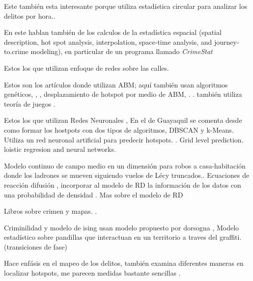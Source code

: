 \documentclass[onecolumn,12pt,letterpaper]{article}
\begin{document}
Este también esta interesante porque utiliza estadística circular para analizar los delitos por hora.\cite{brunsdon2006using}.


En este hablan también de los calculos de la estadística espacial (spatial description, hot spot analysis, interpolation, space-time analysis, and journey-to.crime modeling), en particular de un programa llamado \textit{CrimeStat}\cite{levine2006crime}

Estos los que utilizan enfoque de redes sobre las calles\cite{rosser_predictive_2017}. \cite{porta_network_2006} \cite{porta_network_2006-1} \cite{davies_modelling_2013}

Estos son los artículos donde utilizan ABM; aquí también usan algoritmos genéticos\cite{furtado_bio-inspired_2009}, \cite{malleson_agent-based_2009}, \cite{malleson_crime_2010} , desplazamiento de hotspot por medio de ABM\cite{wang_analyzing_2014}, \cite{devia_generating_2013}. \cite{hegemann_geographical_2011}. \cite{groff_simulation_2007} también utiliza teoría de juegos  \cite{bruni_what_2013}.


Estos los que utilizan Redes Neuronales \cite{francisco_alisis_2015}, \cite{olligschlaeger_artificial_1998}
En el de Guayaquil se comenta desde como formar los hostpots con dos tipos de algoritmos, DBSCAN y k-Means. Utiliza un red neuronal artificial para predecir hotspots.\cite{garcia-plua_deteccion_2017} \cite{zhuang_crime_2017}. Grid level prediction. loistic regresion and neural networks. \cite{rummens_use_2017}

Modelo continuo de campo medio en un dimensión para robos a casa-habitación donde los ladrones se mueven siguiendo vuelos de Lécy truncados.\cite{pan_crime_2018}. Ecuaciones de reacción difusión \cite{short_dissipation_2010}, incorporar al modelo de RD la información de los datos con una probabilidad de densidad \cite{woodworth_j._t._non-local_2014}. Mas sobre el modelo de RD \cite{short_nonlinear_2010}


Libros sobre crimen y mapas. \cite{rossmo_geographic_2014} \cite{santos_crime_2016} \cite{liu_artificial_2008} \cite{weisburd_crime_1998} \cite{chainey_crime_2008}. 


Criminilidad y modelo de ising usan modelo propuesto por dorsogna \cite{ayouche_second_2015}, 
Modelo estadístico sobre pandillas que interactuan en un territorio a traves del graffiti.(transiciones de fase)\cite{barbaro_territorial_2013}

Hace enfásis en el mapeo de los delitos, también examina diferentes maneras en localizar hotspots, me parecen medidas bastante sencillas \cite{ratcliffe_crime_2010}. 
\end{document}
